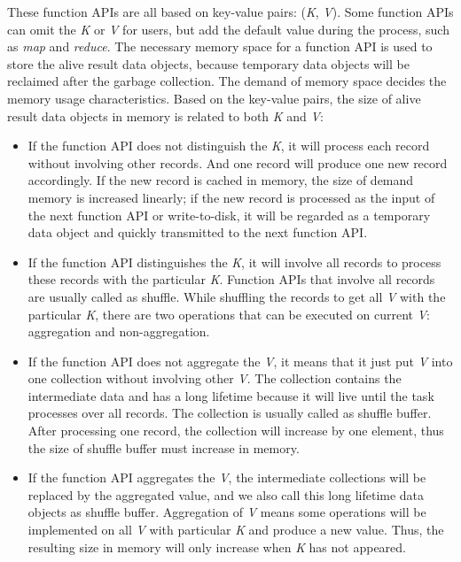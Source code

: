 These function APIs are all based on key-value pairs: (\textit{K}, \textit{V}). Some function APIs can omit the \textit{K} or \textit{V} for users, but add the default value during the process, such as \textit{map} and \textit{reduce}. The necessary memory space for a function API is used to store the alive result data objects, because temporary data objects will be reclaimed after the garbage collection. The demand of memory space decides the memory usage characteristics. Based on the key-value pairs, the size of alive result data objects in memory is related to both \textit{K} and \textit{V}:

\begin{itemize}

\item If the function API does not distinguish the \textit{K}, it will process each record without involving other records. And one record will produce one new record accordingly. If the new record is cached in memory, the size of demand memory is increased linearly; if the new record is processed as the input of the next function API or write-to-disk, it will be regarded as a temporary data object and quickly transmitted to the next function API.

\item If the function API distinguishes the \textit{K}, it will involve all records to process these records with the particular \textit{K}. Function APIs that involve all records are usually called as shuffle. While shuffling the records to get all \textit{V} with the particular \textit{K}, there are two operations that can be executed on current \textit{V}: aggregation and non-aggregation.

\item If the function API does not aggregate the \textit{V}, it means that it just put \textit{V} into one collection without involving other \textit{V}. The collection contains the intermediate data and has a long lifetime because it will live until the task processes over all records. The collection is usually called as shuffle buffer. After processing one record, the collection will increase by one element, thus the size of shuffle buffer must increase in memory.

\item If the function API aggregates the \textit{V}, the intermediate collections will be replaced by the aggregated value, and we also call this long lifetime data objects as shuffle buffer. Aggregation of \textit{V} means some operations will be implemented on all \textit{V} with particular \textit{K} and produce a new value. Thus, the resulting size in memory will only increase when \textit{K} has not appeared.

\end{itemize}

